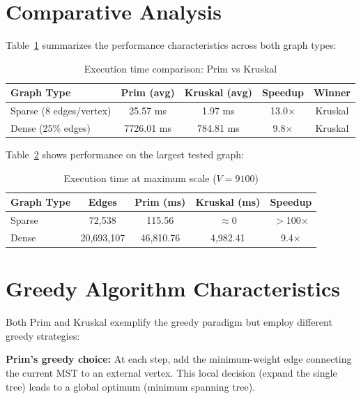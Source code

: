 \documentclass[12pt, a4paper]{report}
\begin{document}
\newpage

\section{Comparative Analysis}

Table~\ref{tab:comparison} summarizes the performance characteristics across both graph types:

\begin{table}[ht]
\centering
\caption{Execution time comparison: Prim vs Kruskal}
\label{tab:comparison}
\begin{tabular}{lcccc}
\toprule
\textbf{Graph Type} & \textbf{Prim (avg)} & \textbf{Kruskal (avg)} & \textbf{Speedup} & \textbf{Winner} \\
\midrule
Sparse (8 edges/vertex) & 25.57 ms & 1.97 ms & 13.0$\times$ & Kruskal \\
Dense (25\% edges)      & 7726.01 ms & 784.81 ms & 9.8$\times$ & Kruskal \\
\bottomrule
\end{tabular}
\end{table}

Table~\ref{tab:largest} shows performance on the largest tested graph:

\begin{table}[ht]
\centering
\caption{Execution time at maximum scale ($V = 9100$)}
\label{tab:largest}
\begin{tabular}{lcccc}
\toprule
\textbf{Graph Type} & \textbf{Edges} & \textbf{Prim (ms)} & \textbf{Kruskal (ms)} & \textbf{Speedup} \\
\midrule
Sparse & 72,538 & 115.56 & $\approx$0 & $>$100$\times$ \\
Dense  & 20,693,107 & 46,810.76 & 4,982.41 & 9.4$\times$ \\
\bottomrule
\end{tabular}
\end{table}

\section{Greedy Algorithm Characteristics}

Both Prim and Kruskal exemplify the greedy paradigm but employ different greedy strategies:

\textbf{Prim's greedy choice:} At each step, add the minimum-weight edge connecting the current MST to an external vertex. This local decision (expand the single tree) leads to a global optimum (minimum spanning tree).
\end{document}
